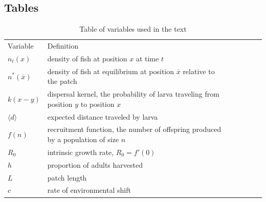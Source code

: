 \documentclass[12pt,english]{article}
\begin{document}
\begin{spacing}{1.9}
\section{Tables}
\begin{table}[h]
\caption{Table of variables used in the text}
\begin{tabular}{@{}lllllll@{}}
  Variable & Definition
\\\cmidrule{1-1} \cmidrule{2-2}   
$n_t(x)$ & density of fish at position $x$ at time $t$
\\ $n^*(\overline{x})$ & density of fish at equilibrium at position $\overline{x}$ relative to the patch 
\\ $k(x-y)$ & dispersal kernel, the probability of larva traveling from position $y$ to position $x$
\\ $\langle d \rangle $ & expected distance traveled by larva
\\ $f(n)$ & recruitment function, the number of offspring produced by a population of size $n$
\\ $R_0$ & intrinsic growth rate, $R_0=f'(0)$
\\ $h$ & proportion of adults harvested
\\ $L$ & patch length
\\ $c$ & rate of environmental shift
\end{tabular}
\label{variables}
\end{table}

\pagebreak



\end{spacing}
\end{document}
